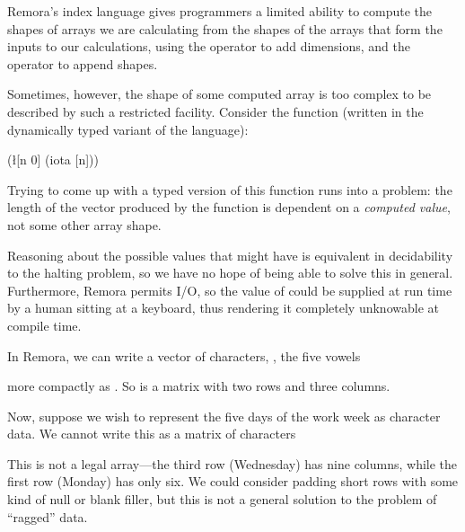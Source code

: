 \begin{itemize}
%
Remora's index language gives programmers a limited ability to compute
the shapes of arrays we are calculating from the shapes of the arrays
that form the inputs to our calculations,
using the \ex{+} operator to add dimensions,
and the \ex{++} operator to append shapes.

Sometimes, however, the shape of some computed array is too complex
to be described by such a restricted facility.
Consider the function
(written in the dynamically typed variant of the language):
\begin{code}
(\l{[n 0]} (iota [n]))\end{code}
Trying to come up with a typed version of this function runs into a problem:
the length of the vector produced by the function is dependent on
a \emph{computed value}, not some other array shape.

Reasoning about the possible values that  might have is
equivalent in decidability to the halting problem,
so we have no hope of being able to solve this in general.
Furthermore, Remora permits I/O, 
so the value of  could be supplied at run time
by a human sitting at a keyboard,
thus rendering it completely unknowable at compile time.

In Remora, we can write a vector of characters, \eg, the five vowels
\begin{code}
[#\\a #\\e #\\i #\\o #\\u]\end{code}
more compactly as .
So  is a matrix with two rows and three columns.

Now, suppose we wish to represent the five days of the work week as
character data.
We cannot write this as a matrix of characters
\begin{code}
\end{code}
This is not a legal array---the third row (Wednesday) has nine columns,
while the first row (Monday) has only six.
We could consider padding short rows with some kind of null or blank filler,
but this is not a general solution to the problem of ``ragged'' data.

\end{itemize}

